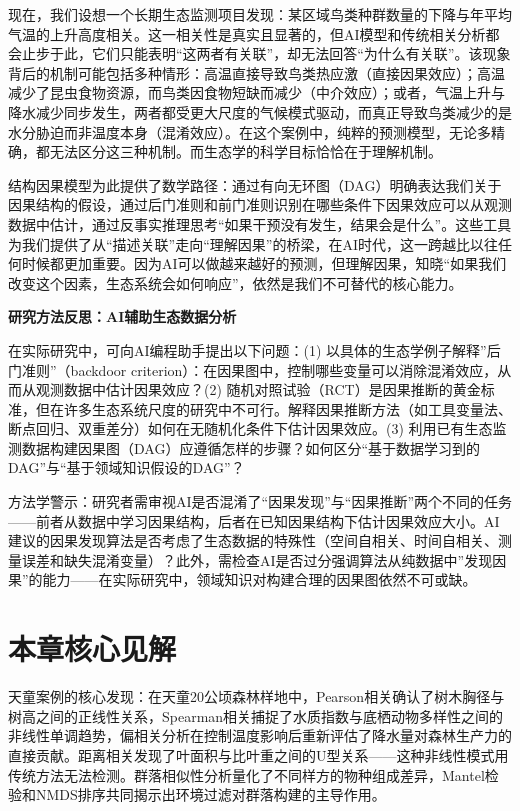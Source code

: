 \documentclass[
  twoside,12pt,fontset=none]{ctexbook}
\renewenvironment{quote}{%
  \def\FrameCommand{{\color{quote-border}\vrule width 4pt}\hspace{10pt}}%
  \MakeFramed {\advance\hsize-\width \FrameRestore\noindent\ignorespaces}%
}{%
  \endMakeFramed
}
\begin{document}
现在，我们设想一个长期生态监测项目发现：某区域鸟类种群数量的下降与年平均气温的上升高度相关。这一相关性是真实且显著的，但AI模型和传统相关分析都会止步于此，它们只能表明``这两者有关联''，却无法回答``为什么有关联''。该现象背后的机制可能包括多种情形：高温直接导致鸟类热应激（直接因果效应）；高温减少了昆虫食物资源，而鸟类因食物短缺而减少（中介效应）；或者，气温上升与降水减少同步发生，两者都受更大尺度的气候模式驱动，而真正导致鸟类减少的是水分胁迫而非温度本身（混淆效应）。在这个案例中，纯粹的预测模型，无论多精确，都无法区分这三种机制。而生态学的科学目标恰恰在于理解机制。

结构因果模型为此提供了数学路径：通过有向无环图（DAG）明确表达我们关于因果结构的假设，通过后门准则和前门准则识别在哪些条件下因果效应可以从观测数据中估计，通过反事实推理思考``如果干预没有发生，结果会是什么''。这些工具为我们提供了从``描述关联''走向``理解因果''的桥梁，在AI时代，这一跨越比以往任何时候都更加重要。因为AI可以做越来越好的预测，但理解因果，知晓``如果我们改变这个因素，生态系统会如何响应''，依然是我们不可替代的核心能力。

\begin{quote}
\textbf{研究方法反思：AI辅助生态数据分析}

在实际研究中，可向AI编程助手提出以下问题：(1) 以具体的生态学例子解释''后门准则''（backdoor criterion）：在因果图中，控制哪些变量可以消除混淆效应，从而从观测数据中估计因果效应？(2) 随机对照试验（RCT）是因果推断的黄金标准，但在许多生态系统尺度的研究中不可行。解释因果推断方法（如工具变量法、断点回归、双重差分）如何在无随机化条件下估计因果效应。(3) 利用已有生态监测数据构建因果图（DAG）应遵循怎样的步骤？如何区分``基于数据学习到的DAG''与``基于领域知识假设的DAG''？

方法学警示：研究者需审视AI是否混淆了``因果发现''与``因果推断''两个不同的任务------前者从数据中学习因果结构，后者在已知因果结构下估计因果效应大小。AI建议的因果发现算法是否考虑了生态数据的特殊性（空间自相关、时间自相关、测量误差和缺失混淆变量）？此外，需检查AI是否过分强调算法从纯数据中''发现因果''的能力------在实际研究中，领域知识对构建合理的因果图依然不可或缺。
\end{quote}

\hypertarget{ux672cux7ae0ux6838ux5fc3ux89c1ux89e3-3}{%
\section{本章核心见解}\label{ux672cux7ae0ux6838ux5fc3ux89c1ux89e3-3}}

天童案例的核心发现：在天童20公顷森林样地中，Pearson相关确认了树木胸径与树高之间的正线性关系，Spearman相关捕捉了水质指数与底栖动物多样性之间的非线性单调趋势，偏相关分析在控制温度影响后重新评估了降水量对森林生产力的直接贡献。距离相关发现了叶面积与比叶重之间的U型关系------这种非线性模式用传统方法无法检测。群落相似性分析量化了不同样方的物种组成差异，Mantel检验和NMDS排序共同揭示出环境过滤对群落构建的主导作用。
\end{document}
